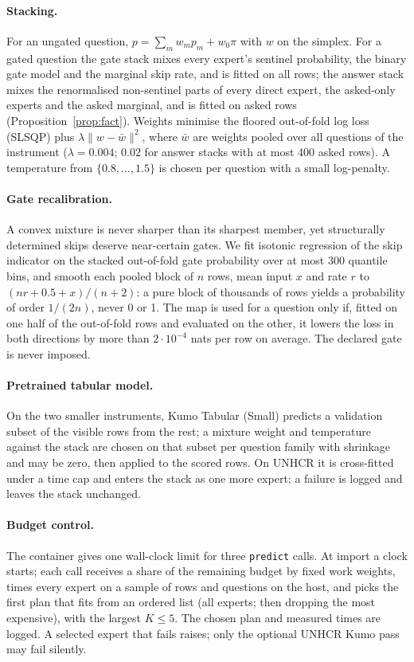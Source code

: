 \documentclass[10pt]{article}
\begin{document}
\paragraph{Stacking.} For an ungated question, $p=\sum_m w_m p_m + w_0\pi$ with $w$ on the simplex. For a gated question the gate stack mixes every expert's sentinel probability, the binary gate model and the marginal skip rate, and is fitted on all rows; the answer stack mixes the renormalised non-sentinel parts of every direct expert, the asked-only experts and the asked marginal, and is fitted on asked rows (Proposition~\ref{prop:fact}). Weights minimise the floored out-of-fold log loss (SLSQP) plus $\lambda\|w-\bar w\|^2$, where $\bar w$ are weights pooled over all questions of the instrument ($\lambda=0.004$; $0.02$ for answer stacks with at most 400 asked rows). A temperature from $\{0.8,\dots,1.5\}$ is chosen per question with a small log-penalty.

\paragraph{Gate recalibration.} A convex mixture is never sharper than its sharpest member, yet structurally determined skips deserve near-certain gates. We fit isotonic regression of the skip indicator on the stacked out-of-fold gate probability over at most 300 quantile bins, and smooth each pooled block of $n$ rows, mean input $x$ and rate $r$ to $(nr+0.5+x)/(n+2)$: a pure block of thousands of rows yields a probability of order $1/(2n)$, never 0 or 1. The map is used for a question only if, fitted on one half of the out-of-fold rows and evaluated on the other, it lowers the loss in both directions by more than $2\cdot10^{-4}$ nats per row on average. The declared gate is never imposed.

\paragraph{Pretrained tabular model.} On the two smaller instruments, Kumo Tabular (Small) predicts a validation subset of the visible rows from the rest; a mixture weight and temperature against the stack are chosen on that subset per question family with shrinkage and may be zero, then applied to the scored rows. On UNHCR it is cross-fitted under a time cap and enters the stack as one more expert; a failure is logged and leaves the stack unchanged.

\paragraph{Budget control.} The container gives one wall-clock limit for three \texttt{predict} calls. At import a clock starts; each call receives a share of the remaining budget by fixed work weights, times every expert on a sample of rows and questions on the host, and picks the first plan that fits from an ordered list (all experts; then dropping the most expensive), with the largest $K\le5$. The chosen plan and measured times are logged. A selected expert that fails raises; only the optional UNHCR Kumo pass may fail silently.
\end{document}
